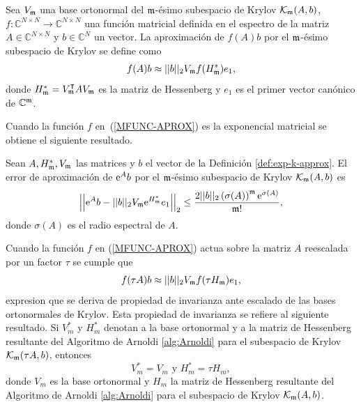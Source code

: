 \begin{definition}\label{def:exp-k-approx}
    \cite{Saad92} Sea $V_{\mathfrak{m}}$ una base ortonormal del $\mathfrak{m}$-ésimo subespacio de Krylov $\mathcal{K}_{\mathfrak{m}}(A,b)$, $f: \mathbb{C}^{N\times N} \to \mathbb{C}^{N\times N}$ una función matricial definida
    en el espectro de la matriz $A\in\mathbb{C}^{N\times N}$ y $b\in\mathbb{C}^{N}$ un vector. La aproximación de $f(A)b$ por el  $\mathfrak{m}$-ésimo subespacio de Krylov se define como
    \begin{equation}
        f(A)b\approx ||b||_2 V_{\mathfrak{m}} f(H^*_{\mathfrak{m}})e_1, \label{MFUNC-APROX}
    \end{equation}
    donde $H_{\mathfrak{m}}^*=V_{\mathfrak{m}}^{\intercal}AV_{\mathfrak{m}}$ es la matriz de Hessenberg y $e_1$ es el primer vector canónico de $\mathbb{C}^{\mathfrak{m}}$.
\end{definition}
Cuando la función $f$ en~(\ref{MFUNC-APROX}) es la exponencial matricial se obtiene el siguiente resultado.
\begin{theorem}\label{exp-bound}
	\cite{Saad92} Sean $A,H^*_{\mathfrak{m}},V_{\mathfrak{m}}$ las matrices y $b$ el vector de la Definición \ref{def:exp-k-approx}. El error de aproximación de $\mathrm{e}^{A}b$ por el $\mathfrak{m}$-ésimo subespacio de Krylov $\mathcal{K}_{\mathfrak{m}}(A,b)$ es
	\begin{equation*}
	\left\lvert\left\lvert \mathrm{e}^{A}b - \lvert\lvert b \rvert\rvert_2 V_{\mathfrak{m}}\mathrm{e}^{H^*_{\mathfrak{m}}}e_1 \right\rvert\right\rvert_2 
	\leq \frac{2\vert\lvert b \rvert\rvert_2 \left( \sigma(A) \right)^{\mathfrak{m}}\mathrm{e}^{\sigma(A)}}{\mathfrak{m}!},
	\end{equation*}
	donde $\sigma(A)$ es el radio espectral de $A$.
\end{theorem}

Cuando la función $f$ en (\ref{MFUNC-APROX}) actua sobre la matriz $A$ reescalada por un factor $\tau$ se cumple que \cite{Saad92}
\begin{equation*}
	f(\tau A)b\approx ||b||_2 V_{\mathfrak{m}} f(\tau H_{\mathfrak{m}})e_1,
\end{equation*}
expresion que se deriva de propiedad de invarianza ante escalado de las bases ortonormales de Krylov. Esta propiedad de invarianza se refiere al siguiente resultado. Si $V^*_m$ y $H^*_m$ denotan a la base ortonormal y a la matriz de Hessenberg resultante del Algoritmo de Arnoldi \ref{alg:Arnoldi} para el subespacio de Krylov $\mathcal{K}_{\mathfrak{m}}(\tau A,b)$, entonces
\[ V^*_m=V_m       \text{   y    }      H^*_m=\tau H_m,\]
donde $V_m$ es la base ortonormal y $H_m$  la matriz de Hessenberg resultante del Algoritmo de Arnoldi \ref{alg:Arnoldi} para el subespacio de Krylov $\mathcal{K}_{\mathfrak{m}}(A,b)$.

